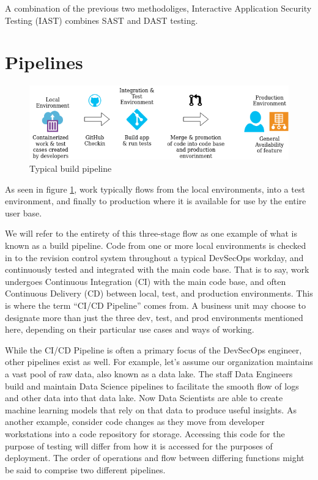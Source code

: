 \justify{}
A combination of the previous two methodoliges, Interactive Application Security Testing (IAST) combines
SAST and DAST testing.

\section{Pipelines}

\begin{figure}[!htb]
\centering
\includegraphics[scale=0.63]{images/flow.png}
\caption{Typical build pipeline}
\label{pipeline}
\end{figure}

\justify{}
As seen in figure \ref{pipeline}, work typically flows from the local environments, into a test
environment, and finally to production where it is available for use by the entire user base.

\justify{}
We will refer to the entirety of this three-stage flow as one example of what is known as a build pipeline.
Code from one or more local environments is checked in to the revision control system throughout a
typical DevSecOps workday, and continuously tested and integrated with the main code base. That is to say, work undergoes
Continuous Integration (CI) with the main code base,
and often Continuous Delivery (CD) between local, test, and production environments. This is
where the term ``CI/CD Pipeline'' comes from. A business unit may choose to designate more than just the three dev, test,
and prod environments mentioned here, depending on their particular use cases and ways of working.

\justify{}
While the CI/CD Pipeline is often a primary focus of the DevSecOps engineer, other pipelines exist as well. For example,
let's assume our organization maintains a vast pool of raw data, also known as a data lake. The staff Data
Engineers build and maintain Data Science pipelines to facilitate the smooth flow
of logs and other data into that data lake. Now Data Scientists are able to create machine learning models that rely on that
data to produce useful insights. As another example, consider code changes as they move from
developer workstations into a code repository for storage. Accessing this code for the purpose of testing will differ from
how it is accessed for the purposes of deployment. The order of operations and flow
between differing functions might be said to comprise two different pipelines.

